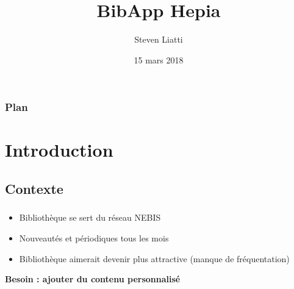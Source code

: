 \documentclass[10pt]{beamer}
\begin{document}

\title{BibApp Hepia}
\author{Steven Liatti}
\date{15 mars 2018}

\begin{frame}
\titlepage
\end{frame}

\begin{frame}
    \frametitle{Plan}
	\setcounter{tocdepth}{3}
	\tableofcontents
\end{frame}

\section{Introduction}
\subsection{Contexte}
\begin{frame}
	\frametitle{\secname}
	\framesubtitle{\subsecname}
    \begin{itemize}
        \item Bibliothèque se sert du réseau NEBIS
        \item Nouveautés et périodiques tous les mois
        \item Bibliothèque aimerait devenir plus attractive (manque de fréquentation)
    \end{itemize}
    \Large\textbf{Besoin : ajouter du contenu personnalisé}
\end{frame}
\end{document}
